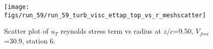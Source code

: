 \begin{figure}[H]
\centering
\texttt{[image: figs/run\_59/run\_59\_turb\_visc\_ettap\_top\_vs\_r\_meshscatter]}
\caption{Scatter plot of $
u_T$ reynolds stress term vs radius at $z/c$=9.50, $V_{free}$=30.9, station 6.}
\end{figure}


